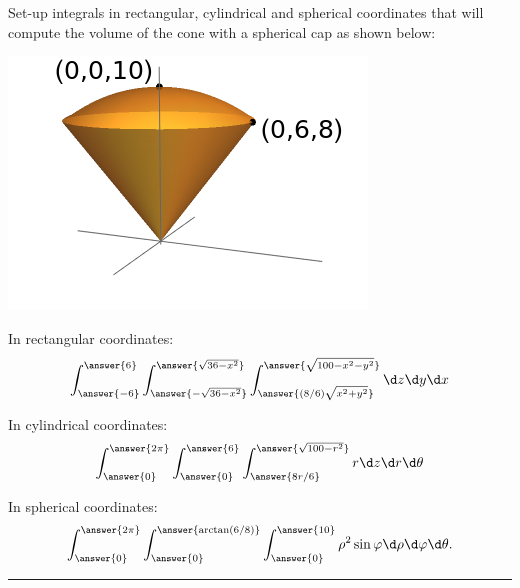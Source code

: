 \documentclass{ximera}
\author{Bart Snapp}
\begin{document}
Set-up integrals in rectangular, cylindrical and spherical coordinates
that will compute the volume of the cone with a spherical cap as shown below:
\begin{image}
  \includegraphics{coneWithCap6-8-10.png}
\end{image}

\begin{problem}
  In rectangular coordinates:
  \[
  \int_{\answer{-6}}^{\answer{6}} \int_{\answer{-\sqrt{36-x^2}}}^{\answer{\sqrt{36-x^2}}} \int_{\answer{(8/6)\sqrt{x^2+y^2}}}^{\answer{\sqrt{100-x^2-y^2}}} \d z \d y \d x
  \]
\end{problem}

\begin{problem}
  In cylindrical coordinates:
  \[
  \int_{\answer{0}}^{\answer{2\pi}} \int_{\answer{0}}^{\answer{6}} \int_{\answer{8r/6}}^{\answer{\sqrt{100-r^2}}} r \d z \d r \d \theta
  \]
\end{problem}


\begin{problem}
  In spherical coordinates:
  \[
  \int_{\answer{0}}^{\answer{2\pi}} \int_{\answer{0}}^{\answer{\arctan(6/8)}} \int_{\answer{0}}^{\answer{10}} \rho^2 \sin \varphi \d \rho \d \varphi \d\theta.
  \]
\end{problem}

\vfill

\hrule

\begin{problem}
  \begin{selectAll}




  \end{selectAll}
\end{problem}
\end{document}
